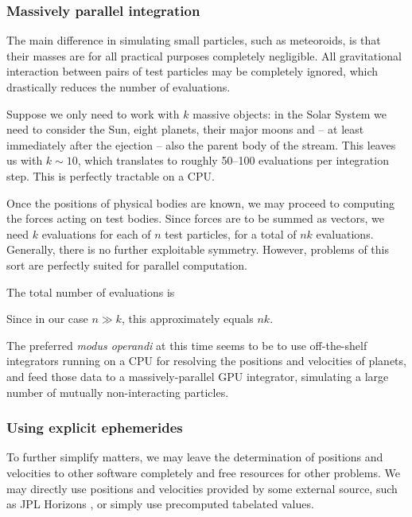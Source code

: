         \subsubsection{Massively parallel integration} \label{asip}
            The main difference in simulating small particles, such as meteoroids,
            is that their masses are for all practical purposes completely negligible.
            All gravitational interaction between pairs of test particles may be completely ignored,
            which drastically reduces the number of evaluations.

            Suppose we only need to work with $k$ massive objects:
            in the Solar System we need to consider the Sun, eight planets, their major moons
            and -- at least immediately after the ejection -- also the parent body of the stream.
            This leaves us with $k \sim 10$, which translates to roughly 50--100 evaluations per integration step.
            This is perfectly tractable on a CPU.

            Once the positions of physical bodies are known, we may proceed to computing the forces acting
            on test bodies. Since forces are to be summed as vectors, we need $k$ evaluations
            for each of $n$ test particles, for a total of $nk$ evaluations.
            Generally, there is no further exploitable symmetry.
            However, problems of this sort are perfectly suited for parallel computation.

            The total number of evaluations is

            Since in our case $n \gg k$, this approximately equals $nk$.

            The preferred \textit{modus operandi} at this time seems to be to use off-the-shelf integrators
            running on a CPU for resolving the positions and velocities of planets, and feed those data
            to a massively-parallel GPU integrator, simulating a large number of mutually non-interacting particles.

        \subsubsection{Using explicit ephemerides} \label{asie}
            To further simplify matters, we may leave the determination of positions and velocities
            to other software completely and free resources for other problems.
            We may directly use positions and velocities provided by some external source,
            such as JPL Horizons \cite{...}, or simply use precomputed tabelated values.

